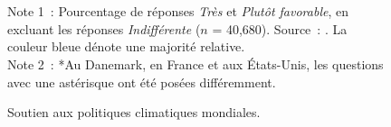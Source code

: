 \documentclass[a5paper,french,openany]{memoir}
\begin{document}
\begin{figure}[b!] %
  \caption[Soutien aux politiques climatiques mondiales]{Soutien aux politiques climatiques mondiales.} 
  \label{fig:oecd} %
  {\footnotesize \\ $\quad$ \\ Note 1~: Pourcentage de réponses \textit{Très} et \textit{Plutôt favorable}, en excluant les réponses \textit{Indifférent\textperiodcentered{}e} ($n$ = 40,680). Source~: \citet{fabre_international_2023}. %
  La couleur bleue dénote une majorité relative. %
  \\ Note 2~: *Au Danemark, en France et aux États-Unis, les questions avec une astérisque ont été posées différemment. %
  } 
\end{figure}
\end{document}
